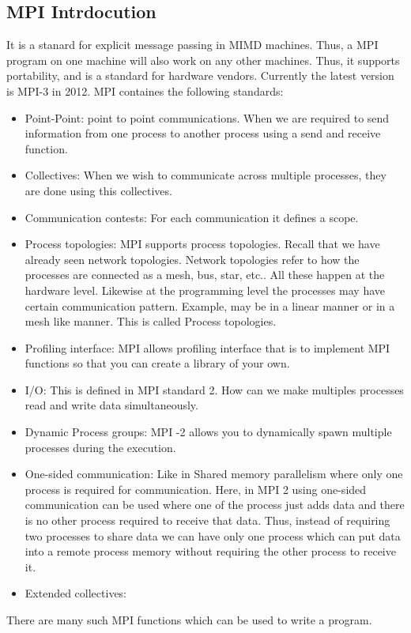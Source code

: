 \documentclass[12pt]{article}
\begin{document}
\subsection{MPI Intrdocution}
It is a stanard for explicit message passing in MIMD machines. Thus, a MPI program on one machine will also work on any other machines. Thus, it supports portability, and is a standard for hardware vendors. Currently the latest version is MPI-3 in 2012.
MPI containes the following standards:
\begin{itemize}
    \item Point-Point: point to point communications. When we are required to send information from one process to another process using a send and receive function.
    \item Collectives: When we wish to communicate across multiple processes, they are done using this collectives.
    \item Communication contests: For each communication it defines a scope.
    \item Process topologies: MPI supports process topologies. Recall that we have already seen network topologies. Network topologies refer to how the processes are connected as a mesh, bus, star, etc..
    All these happen at the hardware level. Likewise at the programming level the processes may have certain communication pattern. Example, may be in a linear manner or in a mesh like manner. This is called Process topologies.
    \item Profiling interface: MPI allows profiling interface that is to implement MPI functions so that you can create a library of your own.
    \item I/O: This is defined in MPI standard 2. How can we make multiples processes read and write data simultaneously.
    \item Dynamic Process groups: MPI -2 allows you to dynamically spawn multiple processes during the execution.
    \item One-sided communication: Like in Shared memory parallelism where only one process is required for communication. Here, in MPI 2 using one-sided communication can be used where one of the process just adds data and there is no other process required to receive that data. Thus, instead of requiring two processes to share data we can have only one process which can put data into a remote process memory without requiring the other process to receive it.
    \item Extended collectives:
\end{itemize}
There are many such MPI functions which can be used to write a program. 
\end{document}
